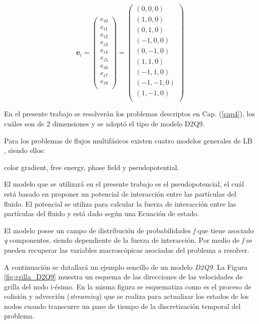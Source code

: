 \begin{equation}
{\mathbf{e}}_{i} =  
\left( \begin{array}{c} 
e_{i0} \\ e_{i1}\\ e_{i2}\\ e_{i3}\\ e_{i4}\\ e_{i5}\\
e_{i6}\\ e_{i7}\\ e_{i8}\\
\end{array}
\right) =
\left( \begin{array}{c} 
(0,0,0) \\ (1,0,0) \\ (0,1,0) \\(-1,0,0) \\ (0,-1,0) \\ (1,1,0) \\
(-1,1,0) \\ (-1,-1,0) \\ (1,-1,0)\\ 
\end{array}
\right) 
\label{eq:velgrilla}
\end{equation}




En el presente trabajo se resolverán los problemas descriptos en Cap. (\ref{cap4}), los cuáles son de 2 dimensiones y se adoptó el tipo de modelo D2Q9. 

Para los problemas de flujos multifásicos existen cuatro modelos generales de LB , siendo ellos:

\qquad \qquad color gradient, free energy, phase field y pseudopotential.

El modelo que se utilizará en el presente trabajo es el pseudopotencial, el cuál está basado en proponer un potencial de interacción entre las partículas del fluido. El potencial se utiliza para calcular la fuerza de interacción entre las partículas del fluido y está dado según una Ecuación de estado. 

El modelo posee un campo de distribución de probabilidades \textit{f} que tiene asociado \textit{q} componentes, siendo dependiente de la fuerza de interacción. Por medio de \textit{f} se pueden recuperar las variables macroscópicas asociadas del problema a resolver.

A continuación se datallará un ejemplo sencillo de un modelo \textit{D2Q9}. La Figura \ref{fig:grilla_D2Q9} muestra un esquema de las direcciones de las velocidades de grilla del nodo i-ésimo. En la misma figura se esquematiza como  es el proceso de colisión y advección (\textit{streaming}) que se realiza para actualizar los estados de los nodos cuando transcurre un paso de tiempo de la discretización temporal del problema. 


